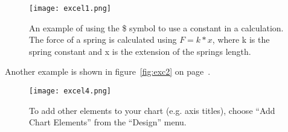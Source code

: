 \begin{figure}[ht]
\texttt{[image: excel1.png]}
\centering
\caption{An example of using the \$ symbol to use a constant in a calculation. The force of a spring is calculated using $F=k * x$, where k is the spring constant and x is the extension of the springs length.}
\label{fig:exc1}
\end{figure}

Another example is shown in figure~\ref{fig:exc2} on page~\pageref{fig:exc2}.

\begin{figure}[ht]
\texttt{[image: excel4.png]}
\centering
\caption{To add other elements to your chart (e.g. axis titles), choose ``Add Chart Elements'' from the ``Design'' menu.}
\label{fig:exc4}
\end{figure}

